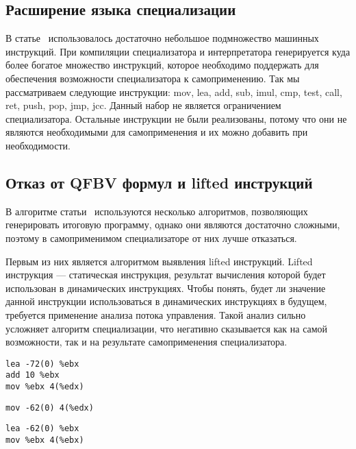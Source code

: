 \subsection{Расширение языка специализации}
\label{part:4.4}
В статье~\cite{PEMC} использовалось достаточно небольшое подмножество машинных инструкций.
При компиляции специализатора и интерпретатора генерируется куда более богатое множество инструкций,
которое необходимо поддержать для обеспечения возможности специализатора к самоприменению.
Так мы рассматриваем следующие инструкции: \textsf{mov, lea, add, sub, imul, cmp, test, call, ret, push, pop, jmp, jcc}.
Данный набор не является ограничением специализатора.
Остальные инструкции не были реализованы, потому что они не являются необходимыми для самоприменения и
их можно добавить при необходимости.


\subsection{Отказ от QFBV формул и lifted инструкций}
\label{part:4.5}

В алгоритме статьи~\cite{PEMC} используются несколько алгоритмов, позволяющих генерировать итоговую программу,
однако они являются достаточно сложными, поэтому в самоприменимом специализаторе от них лучше отказаться. 

Первым из них является алгоритмом выявления lifted инструкций. Lifted инструкция --- статическая инструкция, результат вычисления которой будет использован в динамических инструкциях. Чтобы понять, будет ли значение данной инструкции использоваться в динамических инструкциях в будущем, требуется применение анализа потока управления. Такой анализ сильно усложняет алгоритм специализации, что негативно сказывается как на самой возможности, так и на результате самоприменения
специализатора.
\newsavebox\boxfour
\begin{lrbox}{\boxfour}
\begin{lstlisting}[xleftmargin = 20pt]
lea -72(0) %ebx
add 10 %ebx
mov %ebx 4(%edx)
\end{lstlisting}
\end{lrbox}

\newsavebox\boxfive
\begin{lrbox}{\boxfive}
\begin{lstlisting}[xleftmargin = 20pt]
mov -62(0) 4(%edx)
\end{lstlisting}
\end{lrbox}

\newsavebox\boxsix
\begin{lrbox}{\boxsix}
\begin{lstlisting}[xleftmargin = 20pt]
lea -62(0) %ebx 
mov %ebx 4(%ebx)
\end{lstlisting}
\end{lrbox}

